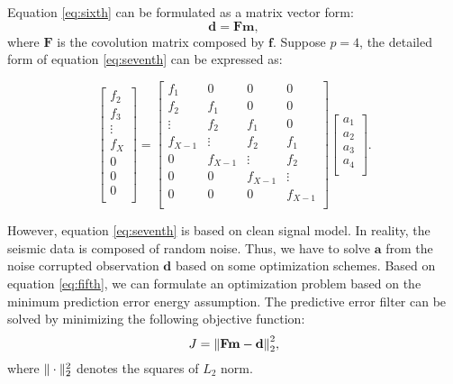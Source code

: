 Equation \ref{eq:sixth} can be formulated as a matrix vector form:
\begin{equation}
\label{eq:seventh}
\mathbf{d}=\mathbf{Fm},
\end{equation}
where $\mathbf{F}$ is the covolution matrix composed by $\mathbf{f}$. Suppose $p=4$, the detailed form of equation \ref{eq:seventh} can be expressed as:

\begin{equation}
\label{eq:eigth}
\left[ \begin{array}{c}
f_2\\
f_3\\
\vdots\\
f_{X}\\
0\\
0\\
0\\
\end{array}\right]
=
\left[\begin{array}{cccc} 
f_1 & 0 & 0 & 0 \\
f_2 & f_1 & 0 & 0 \\
\vdots &f_2&f_1 & 0 \\
f_{X-1}& \vdots &f_2&f_1\\ 
0&f_{X-1}&\vdots& f_2 \\
0&0&f_{X-1}&\vdots \\
0&0&0&f_{X-1} \\
\end{array}\right] 
\left[ \begin{array}{c}
a_1\\
a_2\\
a_3\\
a_{4}\\
\end{array}\right].
\end{equation}

However, equation \ref{eq:seventh} is based on clean signal model. In reality, the seismic data is composed of random noise. Thus, we have to solve $\mathbf{a}$ from the noise corrupted observation $\mathbf{d}$ based on some optimization schemes. Based on equation \ref{eq:fifth}, we can formulate an optimization problem based on the minimum prediction error energy assumption. The predictive error filter can be solved by minimizing the following objective function:
\begin{equation}
\label{eq:objective}
J={\Arrowvert \mathbf{Fm}-\mathbf{d} \Arrowvert}_2^2,
\end{equation}
where $\Arrowvert\cdot\Arrowvert_2^2$ denotes the squares of $L_2$ norm. 

